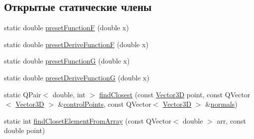 \subsection*{Открытые статические члены}
\begin{DoxyCompactItemize}
\item 
static double \mbox{\hyperlink{class_body_fragmentation_aed0eb252da338a5164957a5aee5486c6}{preset\+FunctionF}} (double x)
\item 
static double \mbox{\hyperlink{class_body_fragmentation_aae27593b7d947e49723d6efb29533b0c}{preset\+Derive\+FunctionF}} (double x)
\item 
static double \mbox{\hyperlink{class_body_fragmentation_aef27baaa1add101e113de555aaaeabcc}{preset\+FunctionG}} (double x)
\item 
static double \mbox{\hyperlink{class_body_fragmentation_a6a9c0eaa064025336ed5338d329955b5}{preset\+Derive\+FunctionG}} (double x)
\item 
static Q\+Pair$<$ double, int $>$ \mbox{\hyperlink{class_body_fragmentation_a603a59196a3a1656c2d1b71014d68075}{find\+Closest}} (const \mbox{\hyperlink{class_vector3_d}{Vector3D}} point, const Q\+Vector$<$ \mbox{\hyperlink{class_vector3_d}{Vector3D}} $>$ \&\mbox{\hyperlink{class_body_fragmentation_a68ff3b27f313fa4f8b8bc7209a7c6da9}{control\+Points}}, const Q\+Vector$<$ \mbox{\hyperlink{class_vector3_d}{Vector3D}} $>$ \&\mbox{\hyperlink{class_body_fragmentation_a636adca1ec65305257c4ffae191bcdde}{normals}})
\item 
static int \mbox{\hyperlink{class_body_fragmentation_aa68b7a8cf5a0f42d0800b02298377998}{find\+Closet\+Element\+From\+Array}} (const Q\+Vector$<$ double $>$ arr, const double point)
\end{DoxyCompactItemize}

